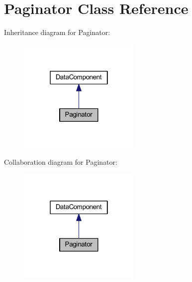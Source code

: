 \hypertarget{classhamburgscleanest_1_1_data_tables_1_1_models_1_1_data_components_1_1_paginator}{}\section{Paginator Class Reference}
\label{classhamburgscleanest_1_1_data_tables_1_1_models_1_1_data_components_1_1_paginator}


Inheritance diagram for Paginator\+:
\nopagebreak
\begin{figure}[H]
\begin{center}
\leavevmode
\includegraphics[width=166pt]{classhamburgscleanest_1_1_data_tables_1_1_models_1_1_data_components_1_1_paginator__inherit__graph}
\end{center}
\end{figure}


Collaboration diagram for Paginator\+:
\nopagebreak
\begin{figure}[H]
\begin{center}
\leavevmode
\includegraphics[width=166pt]{classhamburgscleanest_1_1_data_tables_1_1_models_1_1_data_components_1_1_paginator__coll__graph}
\end{center}
\end{figure}

